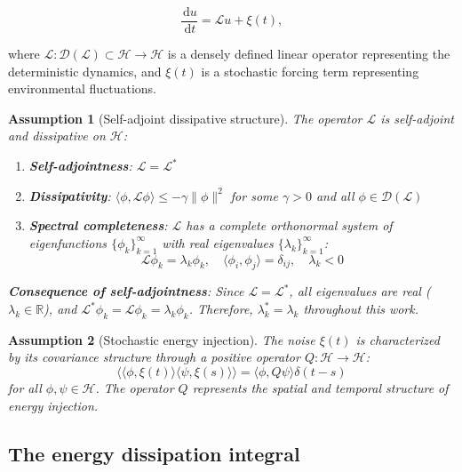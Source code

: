 \documentclass[a4paper,12pt]{article}
\newtheorem{assumption}{Assumption}[section]
\newcommand{\dd}{\,\mathrm{d}}
\def\H{\mathcal{H}}
\newcommand{\inner}[2]{\langle #1, #2 \rangle}
\newcommand{\expval}[1]{\langle #1 \rangle}
\begin{document}
\begin{equation}\label{eq:evolution}
\frac{\dd u}{\dd t} = \mathcal{L}u + \xi(t),
\end{equation}

where $\mathcal{L}: \mathcal{D}(\mathcal{L}) \subset \H \to \H$ is a densely defined linear operator representing the deterministic dynamics, and $\xi(t)$ is a stochastic forcing term representing environmental fluctuations.

\begin{assumption}[Self-adjoint dissipative structure]\label{ass:selfadjoint}
The operator $\mathcal{L}$ is self-adjoint and dissipative on $\H$:
\begin{enumerate}
\item \textbf{Self-adjointness}: $\mathcal{L} = \mathcal{L}^*$
\item \textbf{Dissipativity}: $\inner{\phi}{\mathcal{L}\phi} \leq -\gamma \|\phi\|^2$ for some $\gamma > 0$ and all $\phi \in \mathcal{D}(\mathcal{L})$
\item \textbf{Spectral completeness}: $\mathcal{L}$ has a complete orthonormal system of eigenfunctions $\{\phi_k\}_{k=1}^{\infty}$ with real eigenvalues $\{\lambda_k\}_{k=1}^{\infty}$:
\begin{equation}
\mathcal{L}\phi_k = \lambda_k \phi_k, \quad \inner{\phi_i}{\phi_j} = \delta_{ij}, \quad \lambda_k < 0
\end{equation}
\end{enumerate}
\textbf{Consequence of self-adjointness}: Since $\mathcal{L} = \mathcal{L}^*$, all eigenvalues are real ($\lambda_k \in \mathbb{R}$), and $\mathcal{L}^*\phi_k = \mathcal{L}\phi_k = \lambda_k \phi_k$. Therefore, $\lambda_k^* = \lambda_k$ throughout this work.
\end{assumption}

\begin{assumption}[Stochastic energy injection]\label{ass:noise}
The noise $\xi(t)$ is characterized by its covariance structure through a positive operator $Q: \H \to \H$:
\begin{equation}
\expval{\inner{\phi}{\xi(t)}\inner{\psi}{\xi(s)}} = \inner{\phi}{Q\psi}\delta(t-s)
\end{equation}
for all $\phi, \psi \in \H$. The operator $Q$ represents the spatial and temporal structure of energy injection.
\end{assumption}

\subsection{The energy dissipation integral}
\end{document}
